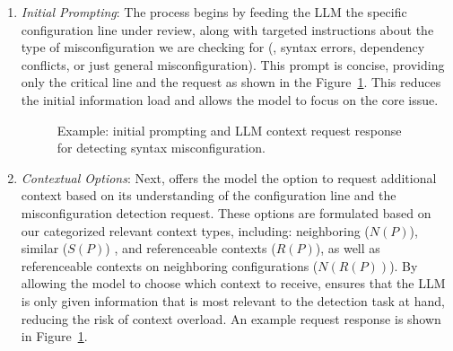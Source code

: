 \begin{enumerate}
    \item \textit{Initial Prompting}: The process begins by feeding the LLM the specific configuration line under review, along with targeted instructions about the type of misconfiguration we are checking for (\eg, syntax errors, dependency conflicts, or just general misconfiguration). This prompt is concise, providing only the critical line and the request as shown in the Figure~\ref{fig:initial_prompt}. This reduces the initial information load and allows the model to focus on the core issue.


    \begin{figure}[t]
    \centering
    \caption{Example: initial prompting and LLM context request response for detecting syntax misconfiguration.}
    \label{fig:initial_prompt}
\end{figure}

    \item \textit{Contextual Options}: Next, \sysname{} offers the model the option to request additional context based on its understanding of the configuration line and the misconfiguration detection request. These options are formulated based on our categorized relevant context types, including: neighboring (\( N(P) \)), similar (\(S(P) \)) , and referenceable contexts (\( R(P) \)), as well as referenceable contexts on neighboring configurations (\( N(R(P)) \)). By allowing the model to choose which context to receive, \sysname{} ensures that the LLM is only given information that is most relevant to the detection task at hand, reducing the risk of context overload. An example request response is shown in Figure~\ref{fig:initial_prompt}.
    

\end{enumerate}
